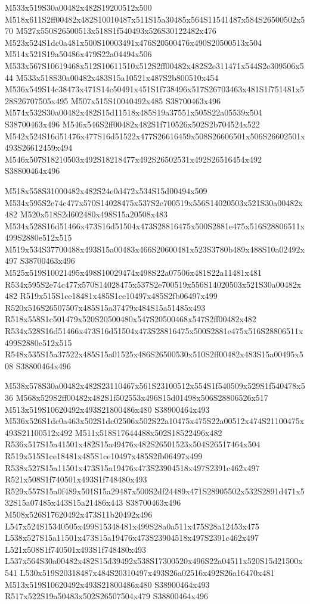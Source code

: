\documentclass{article}
\begin{document}
\begin{multicols}{2}
M533x519S30a00482x482S19200512x500 M518x611S2ff00482x482S10010487x511S15a30485x564S11541487x584S26500502x570 M527x550S26500513x518S1f540493x526S30122482x476 M523x524S1dc0a481x500S10003491x476S20500476x490S20500513x504 M514x521S19a50486x479S22a04494x506 M533x567S10619468x512S10611510x512S2ff00482x482S2e311471x544S2e309506x544 M533x518S30a00482x483S15a10521x487S2b800510x454 M536x549S14c38473x471S14c50491x451S1f738496x517S26703463x481S1f751481x528S26707505x495 M507x515S10040492x485 S38700463x496 M574x532S30a00482x482S15d11518x485S19a37551x505S22a05539x504 S38700463x496 M546x546S2ff00482x482S1f710526x502S2b704524x522 M542x524S16d51476x477S16d51522x477S26616459x508S26606501x506S26602501x493S26612459x494 M546x507S18210503x492S18218477x492S26502531x492S26516454x492 S38800464x496

M518x558S31000482x482S24e0d472x534S15d00494x509 M534x595S2e74c477x570S14028475x537S2e700519x556S14020503x521S30a00482x482 M520x518S2d602480x498S15a20508x483 M534x528S16d51466x473S16d51504x473S28816475x500S2881e475x516S28806511x499S2880e512x515 M519x534S37700488x493S15a00483x466S20600481x523S3780b489x488S10a02492x497 S38700463x496 M525x519S10021495x498S10029474x498S22a07506x481S22a11481x481 R534x595S2e74c477x570S14028475x537S2e700519x556S14020503x521S30a00482x482 R519x515S1ce18481x485S1ce10497x485S2fb06497x499 R520x516S26507507x485S15a37479x484S15a51485x493 R518x558S1c501479x520S20500480x547S20500468x547S2ff00482x482 R534x528S16d51466x473S16d51504x473S28816475x500S2881e475x516S28806511x499S2880e512x515 R548x535S15a37522x485S15a01525x486S26500530x510S2ff00482x483S15a00495x508 S38800464x496

M538x578S30a00482x482S23110467x561S23100512x554S1f540509x529S1f540478x536 M568x529S2ff00482x482S1f502553x496S15d01498x506S28806526x517 M513x519S10620492x493S21800486x480 S38900464x493 M536x526S1dc0a463x502S1dc02506x502S22a10475x475S22a00512x474S21100475x493S21100512x492 M511x518S17644488x502S18522496x482 R536x517S15a41501x482S15a49476x482S26501523x504S26517464x504 R519x515S1ce18481x485S1ce10497x485S2fb06497x499 R538x527S15a11501x473S15a19476x473S23904518x497S2391c462x497 R521x508S1f740501x493S1f748480x493 R529x557S15a0f489x501S15a29487x500S2df24489x471S28905502x532S2891d471x532S15a07485x443S15a21486x443 S38700463x496 M508x526S17620492x473S11b20492x496 L547x524S15340505x499S15348481x499S28a0a511x475S28a12453x475 L538x527S15a11501x473S15a19476x473S23904518x497S2391c462x497 L521x508S1f740501x493S1f748480x493 L537x564S30a00482x482S15d39492x538S17300520x496S22a04511x520S15d21500x541 L530x519S20318487x484S20310497x493S26a02516x492S26a16470x481 M513x519S10620492x493S21800486x480 S38900464x493 R517x522S19a50483x502S26507504x479 S38800464x496


\end{multicols}
\end{document}
